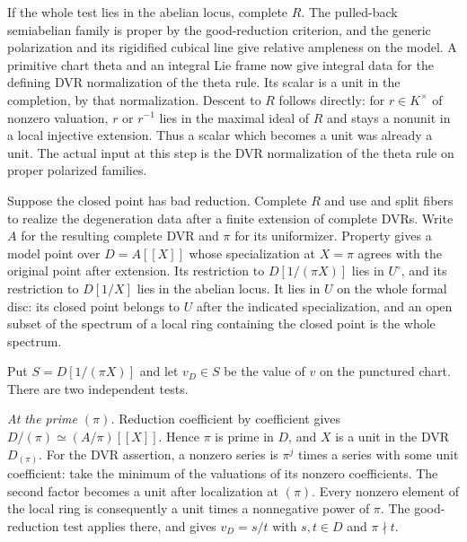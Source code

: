 If the whole test lies in the abelian locus, complete \(R\).
The pulled-back semiabelian family is proper by the good-reduction
criterion, and the generic polarization and its rigidified cubical
line give relative ampleness on the model. A primitive chart theta
and an integral Lie frame now give integral data for the defining
DVR normalization of the theta rule. Its scalar is a unit in the
completion, by that normalization. Descent to \(R\) follows directly:
for \(r\in K^\times\) of nonzero valuation, \(r\) or \(r^{-1}\) lies
in the maximal ideal of \(R\) and stays a nonunit in a local
injective extension. Thus a scalar which becomes a unit was already
a unit. The actual input at this step is the DVR normalization of
the theta rule on proper polarized families.

Suppose the closed point has bad reduction. Complete \(R\) and use
 and split fibers to realize the degeneration data after
a finite extension of complete DVRs. Write \(A\) for the resulting
complete DVR and \(\pi\) for its uniformizer. Property 
gives a model point over \(D=A[[X]]\) whose specialization at
\(X=\pi\) agrees with the original point after extension. Its
restriction to \(D[1/(\pi X)]\) lies in \(U^\circ\), and its
restriction to \(D[1/X]\) lies in the abelian locus. It lies in
\(U\) on the whole formal disc: its closed point belongs to \(U\)
after the indicated specialization, and an open subset of the
spectrum of a local ring containing the closed point is the whole
spectrum.

Put \(S=D[1/(\pi X)]\) and let \(v_D\in S\) be the value of \(v\)
on the punctured chart. There are two independent tests.

\emph{At the prime \((\pi)\).}
Reduction coefficient by coefficient gives
\(D/(\pi)\simeq (A/\pi)[[X]]\). Hence \(\pi\) is prime in \(D\),
and \(X\) is a unit in the DVR \(D_{(\pi)}\).
For the DVR assertion, a nonzero series is \(\pi^j\) times a
series with some unit coefficient: take the minimum of the
valuations of its nonzero coefficients. The second factor becomes
a unit after localization at \((\pi)\). Every nonzero element of
the local ring is consequently a unit times a nonnegative power
of \(\pi\). The good-reduction test applies there, and gives
\(v_D=s/t\) with \(s,t\in D\) and \(\pi\nmid t\).

